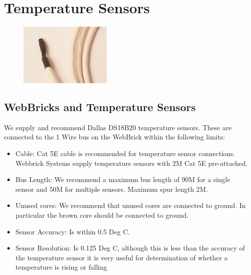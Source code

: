 \section{Temperature Sensors}

\begin{figure}[H]
\centering
\includegraphics[width=0.4\textwidth]{Images/TempSensorPic.png}
\end{figure}

\subsection{WebBricks and Temperature Sensors}

We supply and recommend Dallas DS18B20 temperature sensors.  These are connected to the 1 Wire bus on the WebBrick
within the following limits:

	\begin{itemize}
	  
	  \item{Cable:} Cat 5E cable is recommended for temperature sensor connections.  Webbrick Systems supply
	  		temperature sensors with 2M Cat 5E pre-attached.
	  		
	  \item{Bus Length:}  We recommend a maximum bus length of 90M for a single sensor and 50M for multiple sensors.
	  			Maximum spur length 2M.
	  			
	  \item{Unused cores:} We recommend that unused cores are connected to ground.  In particular the brown core
	  			should be connected to ground.
	  			
	  \item{Sensor Accuracy:} Is within 0.5 Deg C.
	  
	  \item{Sensor Resolution:} Is 0.125 Deg C, although this is less than the accuracy of the temperature sensor
	  				it is very useful for determination of whether a temperature is rising or falling
	  
	\end{itemize}


